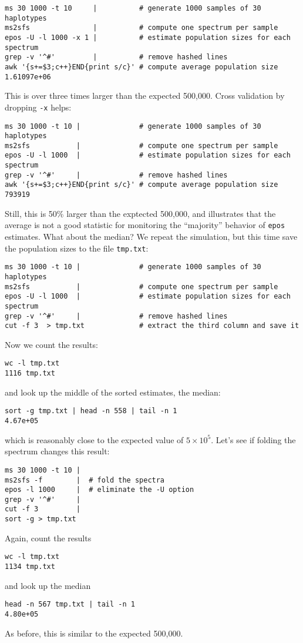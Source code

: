 \documentclass[a4paper, english]{article}
\newcommand{\ty}{\texttt}
\begin{document}
\begin{itemize}
\begin{verbatim}
ms 30 1000 -t 10     |          # generate 1000 samples of 30 haplotypes
ms2sfs               |          # compute one spectrum per sample
epos -U -l 1000 -x 1 |          # estimate population sizes for each spectrum
grep -v '^#'         |          # remove hashed lines
awk '{s+=$3;c++}END{print s/c}' # compute average population size
1.61097e+06
\end{verbatim}
This is over three times larger than the expected 500,000. Cross
validation by dropping \ty{-x} helps:
\begin{verbatim}
ms 30 1000 -t 10 |              # generate 1000 samples of 30 haplotypes
ms2sfs           |              # compute one spectrum per sample
epos -U -l 1000  |              # estimate population sizes for each spectrum
grep -v '^#'     |              # remove hashed lines
awk '{s+=$3;c++}END{print s/c}' # compute average population size
793919
\end{verbatim}
Still, this is 50\% larger than the exptected 500,000, and
illustrates that the average is not a good statistic for monitoring
the ``majority'' behavior of \ty{epos} estimates. What about the
median? We repeat the simulation, but this time save the population
sizes to the file \ty{tmp.txt}:
\begin{verbatim}
ms 30 1000 -t 10 |              # generate 1000 samples of 30 haplotypes
ms2sfs           |              # compute one spectrum per sample
epos -U -l 1000  |              # estimate population sizes for each spectrum
grep -v '^#'     |              # remove hashed lines
cut -f 3  > tmp.txt             # extract the third column and save it
\end{verbatim}
Now we count the results:
\begin{verbatim}
wc -l tmp.txt 
1116 tmp.txt
\end{verbatim}
and look up the middle of the sorted estimates, the median:
\begin{verbatim}
sort -g tmp.txt | head -n 558 | tail -n 1
4.67e+05
\end{verbatim}
which is reasonably close to the expected value of $5\times
10^5$. 
Let's see if folding the
spectrum changes this result:
\begin{verbatim}
ms 30 1000 -t 10 | 
ms2sfs -f        |  # fold the spectra 
epos -l 1000     |  # eliminate the -U option
grep -v '^#'     |
cut -f 3         |
sort -g > tmp.txt
\end{verbatim}
Again, count the results
\begin{verbatim}
wc -l tmp.txt 
1134 tmp.txt
\end{verbatim}
and look up the median
\begin{verbatim}
head -n 567 tmp.txt | tail -n 1
4.80e+05
\end{verbatim}
As before, this is similar to the expected 500,000. 
\end{itemize}
\end{document}
